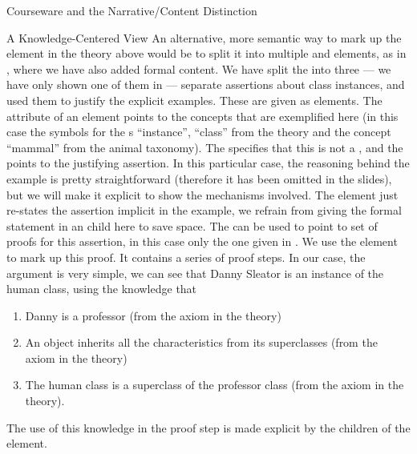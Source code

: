 \begin{omgroup}[id=courseware]{Courseware and the Narrative/Content Distinction}
\begin{omgroup}[id=courseware.knowledge-centered]{A Knowledge-Centered View}
An alternative, more semantic way to mark up the {} element in the
theory above would be to split it into multiple {} and
{} elements, as in {}, where we have also added
formal content. We have split the {} {} into
three --- we have only shown one of them in {} --- separate
assertions about class instances, and used them to justify the explicit examples. These
are given as {\omdoc} {} elements. The {}
attribute of an {} element points to the concepts that are exemplified
here (in this case the symbols for the {s} ``instance'', ``class'' from
the theory {} and the concept ``mammal'' from the animal taxonomy). The
{} specifies that this is not a {}, and
the {} points to the justifying assertion. In this
particular case, the reasoning behind the example is pretty straightforward (therefore it
has been omitted in the slides), but we will make it explicit to show the mechanisms
involved. The {} element just re-states the assertion implicit in the
example, we refrain from giving the formal statement in an {} child here to
save space. The {} can be used to point to set of proofs for
this assertion, in this case only the one given in {}. We use the
{\omdoc} {} element to mark up this proof.  It contains a series of
{} proof steps. In our case, the argument is very simple, we can see that
Danny Sleator is an instance of the human class, using the knowledge that
\begin{enumerate}
\item Danny is a professor (from the axiom in the {}
  theory)
\item An object inherits all the characteristics from its superclasses (from the
  axiom {} in the {} theory)
\item The human class is a superclass of the professor class (from the axiom
  {} in the {} theory).
\end{enumerate}
The use of this knowledge in the proof step is made explicit by the
{} children of the {} element.


\end{omgroup}
\end{omgroup}
